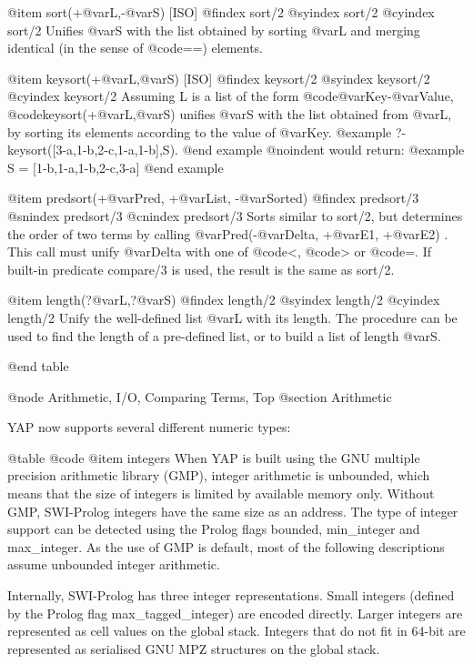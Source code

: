 {{{{@item sort(+@var{L},-@var{S}) [ISO]
@findex sort/2
@syindex sort/2
@cyindex sort/2
Unifies @var{S} with the list obtained by sorting @var{L} and  merging
identical (in the sense of @code{==}) elements.

@item keysort(+@var{L},@var{S}) [ISO]
@findex keysort/2
@syindex keysort/2
@cyindex keysort/2
Assuming L is a list of the form @code{@var{Key}-@var{Value}},
@code{keysort(+@var{L},@var{S})} unifies @var{S} with the list obtained
from @var{L}, by sorting its elements according to the value of
@var{Key}.
@example
?- keysort([3-a,1-b,2-c,1-a,1-b],S).
@end example
@noindent
would return:
@example
S = [1-b,1-a,1-b,2-c,3-a]
@end example

@item predsort(+@var{Pred}, +@var{List}, -@var{Sorted})
@findex predsort/3
@snindex predsort/3
@cnindex predsort/3
Sorts similar to sort/2, but determines the order of two terms by
calling @var{Pred}(-@var{Delta}, +@var{E1}, +@var{E2}) . This call must
unify @var{Delta} with one of @code{<}, @code{>} or @code{=}. If
built-in predicate compare/3 is used, the result is the same as
sort/2.

@item length(?@var{L},?@var{S})
@findex length/2
@syindex length/2
@cyindex length/2
Unify the well-defined list @var{L} with its length. The procedure can
be used to find the length of a pre-defined list, or to build a list
of length @var{S}.

@end table

@node Arithmetic, I/O, Comparing Terms, Top
@section Arithmetic

YAP now supports several different numeric types:

@table @code
@item integers
      When YAP is built using the GNU multiple precision arithmetic
      library (GMP), integer arithmetic is unbounded, which means that
      the size of integers is limited by available memory only. Without
      GMP, SWI-Prolog integers have the same size as an address. The
      type of integer support can be detected using the Prolog flags
      bounded, min_integer and max_integer. As the use of GMP is
      default, most of the following descriptions assume unbounded
      integer arithmetic.

      Internally, SWI-Prolog has three integer representations. Small
      integers (defined by the Prolog flag max_tagged_integer) are
      encoded directly. Larger integers are represented as cell values
      on the global stack. Integers that do not fit in 64-bit are
      represented as serialised GNU MPZ structures on the global stack.

}}}}
